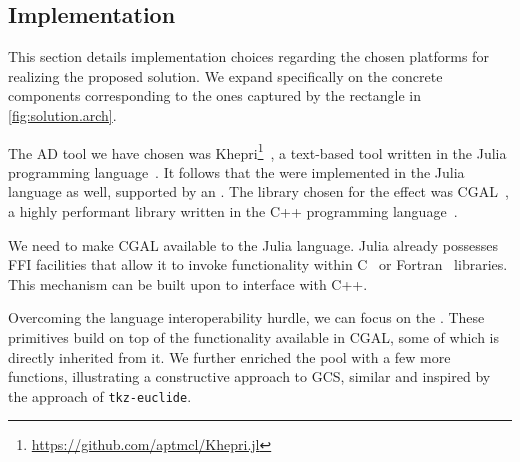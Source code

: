 \subsection{Implementation}%
\label{sec:solution.impl}

This section details implementation choices regarding the chosen platforms for
realizing the proposed solution.  We expand specifically on the concrete
components corresponding to the ones captured by the rectangle in
\cref{fig:solution.arch}.

The \ac{AD} tool we have chosen was
Khepri\footnote{\url{https://github.com/aptmcl/Khepri.jl}}~\cite{Leitao:2019:GRUGEAV},
a text-based tool written in the Julia programming
language~\cite{Bezanson:2017:JAFANC}.  It follows that the \primitives{} were
implemented in the Julia language as well, supported by an \geomlibrary{}.  The
library chosen for the effect was \ac{CGAL}~\cite{CGAL:5.3:Project}, a highly
performant library written in the C++ programming
language~\cite{Stroustrup:2013:CPP}.

We need to make \ac{CGAL} available to the Julia language.  Julia already
possesses \ac{FFI} facilities that allow it to invoke functionality within
C~\cite{Kernighan:1988:C} or Fortran~\cite{Backus:1957:Fortran} libraries.  This
mechanism can be built upon to interface with C++.

Overcoming the language interoperability hurdle, we can focus on the
\primitives{}.  These primitives build on top of the functionality available in
\ac{CGAL}, some of which is directly inherited from it.  We further enriched the
pool with a few more functions, illustrating a constructive approach to
\ac{GCS}, similar and inspired by the approach of \texttt{tkz-euclide}.




